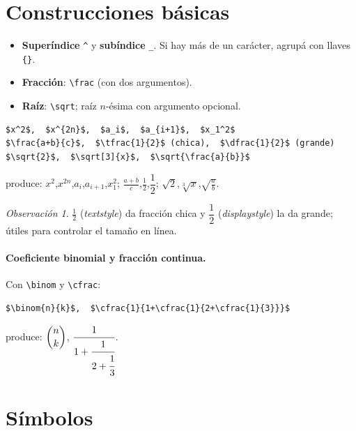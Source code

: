 \documentclass[11pt,a4paper]{article}
\newcommand{\C}[1]{\texttt{\textbackslash #1}}   %
\theoremstyle{plain}      %
\theoremstyle{definition} %
\theoremstyle{remark}
\newtheorem*{obs}{Observación}
\begin{document}
\section{Construcciones básicas}
\begin{itemize}[noitemsep]
  \item \textbf{Superíndice} \verb|^| y \textbf{subíndice} \verb|_|. Si hay más
        de un carácter, agrupá con llaves \verb|{}|.
  \item \textbf{Fracción}: \C{frac} (con dos argumentos).
  \item \textbf{Raíz}: \C{sqrt}; raíz $n$-ésima con argumento opcional.
\end{itemize}
\begin{lstlisting}
$x^2$,  $x^{2n}$,  $a_i$,  $a_{i+1}$,  $x_1^2$
$\frac{a+b}{c}$,  $\tfrac{1}{2}$ (chica),  $\dfrac{1}{2}$ (grande)
$\sqrt{2}$,  $\sqrt[3]{x}$,  $\sqrt{\frac{a}{b}}$
\end{lstlisting}
produce:
$x^2$,\quad $x^{2n}$,\quad $a_i$,\quad $a_{i+1}$,\quad $x_1^2$;\qquad
$\frac{a+b}{c}$,\quad $\tfrac{1}{2}$,\quad $\dfrac{1}{2}$;\qquad
$\sqrt{2}$,\quad $\sqrt[3]{x}$,\quad $\sqrt{\frac{a}{b}}$.

\begin{obs}
$\tfrac{1}{2}$ (\emph{textstyle}) da fracción chica y $\dfrac{1}{2}$
(\emph{displaystyle}) la da grande; útiles para controlar el tamaño en línea.
\end{obs}

\paragraph{Coeficiente binomial y fracción continua.} Con \C{binom} y \C{cfrac}:
\begin{lstlisting}
$\binom{n}{k}$,  $\cfrac{1}{1+\cfrac{1}{2+\cfrac{1}{3}}}$
\end{lstlisting}
produce: $\dbinom{n}{k}$,\qquad
$\cfrac{1}{1+\cfrac{1}{2+\cfrac{1}{3}}}$.

\section{Símbolos}
\end{document}
